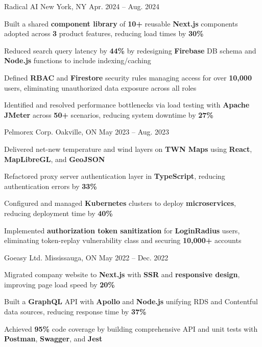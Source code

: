 \documentclass[11pt, a4paper]{awesome-cv}
\begin{document}
\begin{cventries}
  \cventry
    {\color{lightblue}{SOFTWARE ENGINEER INTERN}}
    {Radical AI}
    {New York, NY}
    {Apr. 2024 -- Aug. 2024}
    {
      \begin{cvitems}
        \item{Built a shared \textbf{component library} of \textbf{10+} reusable \textbf{Next.js} components adopted across \textbf{3} product features, reducing load times by \textbf{30\%}}
        \item{Reduced search query latency by \textbf{44\%} by redesigning \textbf{Firebase} DB schema and \textbf{Node.js} functions to include indexing/caching}
        \item{Defined \textbf{RBAC} and \textbf{Firestore} security rules managing access for over \textbf{10,000} users, eliminating unauthorized data exposure across all roles}
        \item{Identified and resolved performance bottlenecks via load testing with \textbf{Apache JMeter} across \textbf{50+} scenarios, reducing system downtime by \textbf{27\%}}
      \end{cvitems}
    }

  \vspace{3mm}

  \cventry
    {\color{lightblue}{SOFTWARE ENGINEER INTERN}}
    {Pelmorex Corp.}
    {Oakville, ON}
    {May 2023 -- Aug. 2023}
    {
      \begin{cvitems}
        \item{Delivered net-new temperature and wind layers on \textbf{TWN Maps} using \textbf{React}, \textbf{MapLibreGL}, and \textbf{GeoJSON}}
        \item{Refactored proxy server authentication layer in \textbf{TypeScript}, reducing authentication errors by \textbf{33\%}}
        \item{Configured and managed \textbf{Kubernetes} clusters to deploy \textbf{microservices}, reducing deployment time by \textbf{40\%}}
        \item{Implemented \textbf{authorization token sanitization} for \textbf{LoginRadius} users, eliminating token-replay vulnerability class and securing \textbf{10,000+} accounts}
      \end{cvitems}
    }

  \vspace{3mm}

  \cventry
    {\color{lightblue}{FRONT-END DEVELOPER INTERN}}
    {Goeasy Ltd.}
    {Mississauga, ON}
    {May 2022 -- Dec. 2022}
    {
      \begin{cvitems}
        \item{Migrated company website to \textbf{Next.js} with \textbf{SSR} and \textbf{responsive design}, improving page load speed by \textbf{20\%}}
        \item{Built a \textbf{GraphQL} API with \textbf{Apollo} and \textbf{Node.js} unifying RDS and Contentful data sources, reducing response time by \textbf{37\%}}
        \item{Achieved \textbf{95\%} code coverage by building comprehensive API and unit tests with \textbf{Postman}, \textbf{Swagger}, and \textbf{Jest}}
      \end{cvitems}
    }


\end{cventries}
\end{document}
